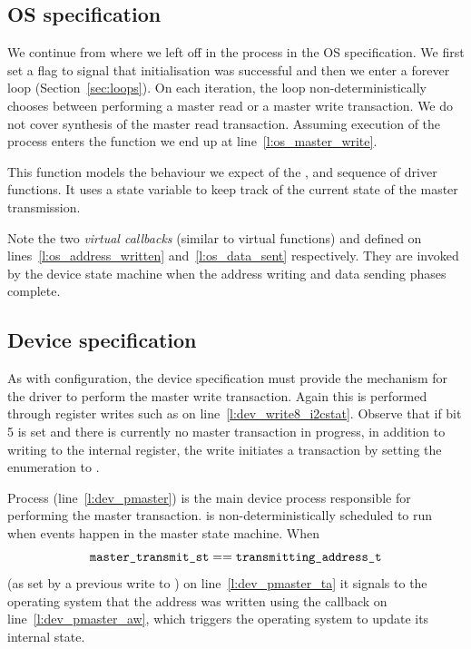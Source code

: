 \subsection{OS specification}
We continue from where we left off in the  process in the OS specification. We first set a flag to signal that initialisation was successful and then we enter a forever loop (Section~\ref{sec:loops}). On each iteration, the loop non-deterministically chooses between performing a master read or a master write transaction. We do not cover synthesis of the master read transaction. Assuming execution of the process enters the  function we end up at line~\ref{l:os_master_write}.

This function models the behaviour we expect of the ,  and  sequence of driver functions. It uses a state variable  to keep track of the current state of the master transmission. 

Note the two \emph{virtual callbacks} (similar to virtual functions)  and  defined on lines~\ref{l:os_address_written} and~\ref{l:os_data_sent} respectively. They are invoked by the device state machine when the address writing and data sending phases complete. 

\subsection{Device specification}
As with configuration, the device specification must provide the mechanism for the driver to perform the master write transaction. Again this is performed through register writes such as  on line~\ref{l:dev_write8_i2cstat}. Observe that if bit 5 is set and there is currently no master transaction in progress, in addition to writing to the internal register, the write initiates a transaction by setting the enumeration  to . 

Process  (line~\ref{l:dev_pmaster}) is the main device process responsible for performing the master transaction.  is non-deterministically scheduled to run when events happen in the master state machine. When 
$$
\texttt{master\_transmit\_st} == \texttt{transmitting\_address\_t} 
$$
(as set by a previous write to ) on line~\ref{l:dev_pmaster_ta} it signals to the operating system that the address was written using the  callback on line~\ref{l:dev_pmaster_aw}, which triggers the operating system to update its internal state.

